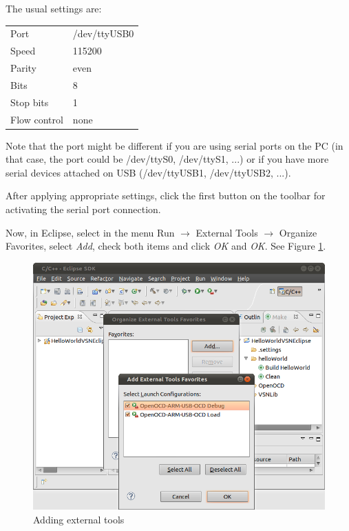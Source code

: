 \documentclass[a4paper, 10pt]{article}
\begin{document}

The usual settings are:

    \smallskip
    \begin{tabular}{ l l }
    Port         & /dev/ttyUSB0 \\
    Speed        & 115200       \\
    Parity       & even         \\
    Bits         & 8            \\
    Stop bits    & 1            \\
    Flow control & none         \\
    \end{tabular}
    \smallskip

Note that the port might be different if you are using serial ports on the PC
(in that case, the port could be /dev/ttyS0, /dev/ttyS1, ...)
or if you have more serial devices attached on USB (/dev/ttyUSB1, /dev/ttyUSB2, ...).

After applying appropriate settings, click the first button on the toolbar for
activating the serial port connection.

Now, in Eclipse, select
in the menu
Run $\rightarrow$ External Tools $\rightarrow$ Organize Favorites,
select \emph{Add}, check both items and click \emph{OK} and \emph{OK}.
See Figure \ref{fig:compile-external-tools}.

    \begin{figure}[H]
    \centering
        \includegraphics[width=\textwidth]{./install-guide-linux-images/compile-external-tools.png}
        \caption{Adding external tools}
        \label{fig:compile-external-tools}
    \end{figure}
\end{document}
